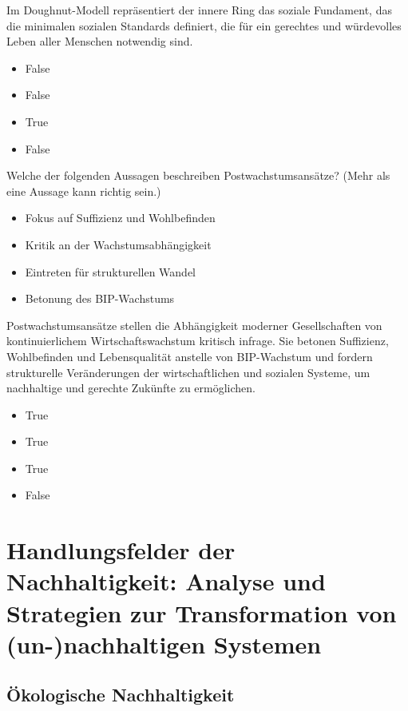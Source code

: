 \documentclass[
  nswissgerman,
  a4paper,
  openany]{book}
\providecommand{\tightlist}{%
  \setlength{\itemsep}{0pt}\setlength{\parskip}{0pt}}
\begin{document}
Im Doughnut-Modell repräsentiert der innere Ring das soziale Fundament,
das die minimalen sozialen Standards definiert, die für ein gerechtes
und würdevolles Leben aller Menschen notwendig sind.

\begin{itemize}
\tightlist
\item
  False
\item
  False
\item
  True
\item
  False
\end{itemize}

Welche der folgenden Aussagen beschreiben Postwachstumsansätze? (Mehr
als eine Aussage kann richtig sein.)

\begin{itemize}
\tightlist
\item[$\square$]
  Fokus auf Suffizienz und Wohlbefinden
\item[$\square$]
  Kritik an der Wachstumsabhängigkeit
\item[$\square$]
  Eintreten für strukturellen Wandel
\item[$\square$]
  Betonung des BIP-Wachstums
\end{itemize}

Postwachstumsansätze stellen die Abhängigkeit moderner Gesellschaften
von kontinuierlichem Wirtschaftswachstum kritisch infrage. Sie betonen
Suffizienz, Wohlbefinden und Lebensqualität anstelle von BIP-Wachstum
und fordern strukturelle Veränderungen der wirtschaftlichen und sozialen
Systeme, um nachhaltige und gerechte Zukünfte zu ermöglichen.

\begin{itemize}
\tightlist
\item
  True
\item
  True
\item
  True
\item
  False
\end{itemize}

\part{Handlungsfelder der Nachhaltigkeit: Analyse und Strategien zur
Transformation von (un-)nachhaltigen Systemen}

\chapter{Ökologische
Nachhaltigkeit}\label{uxf6kologische-nachhaltigkeit}
\end{document}
